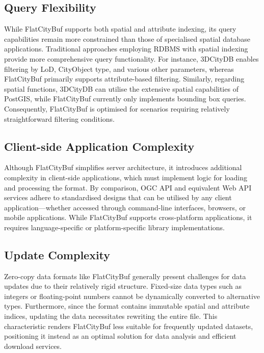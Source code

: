 \subsection{Query Flexibility}
\label{flexibility_of_query}

While FlatCityBuf supports both spatial and attribute indexing, its query capabilities remain more constrained than those of specialised spatial database applications. Traditional approaches employing RDBMS with spatial indexing provide more comprehensive query functionality. For instance, 3DCityDB enables filtering by LoD, CityObject type, and various other parameters, whereas FlatCityBuf primarily supports attribute-based filtering. Similarly, regarding spatial functions, 3DCityDB can utilise the extensive spatial capabilities of PostGIS, while FlatCityBuf currently only implements bounding box queries. Consequently, FlatCityBuf is optimised for scenarios requiring relatively straightforward filtering conditions.

\subsection{Client-side Application Complexity}
\label{complexity_of_client_side_application}

Although FlatCityBuf simplifies server architecture, it introduces additional complexity in client-side applications, which must implement logic for loading and processing the format. By comparison, OGC API and equivalent Web API services adhere to standardised designs that can be utilised by any client application—whether accessed through command-line interfaces, browsers, or mobile applications. While FlatCityBuf supports cross-platform applications, it requires language-specific or platform-specific library implementations.

\subsection{Update Complexity}
\label{ease_of_update}

Zero-copy data formats like FlatCityBuf generally present challenges for data updates due to their relatively rigid structure. Fixed-size data types such as integers or floating-point numbers cannot be dynamically converted to alternative types. Furthermore, since the format contains immutable spatial and attribute indices, updating the data necessitates rewriting the entire file. This characteristic renders FlatCityBuf less suitable for frequently updated datasets, positioning it instead as an optimal solution for data analysis and efficient download services.
